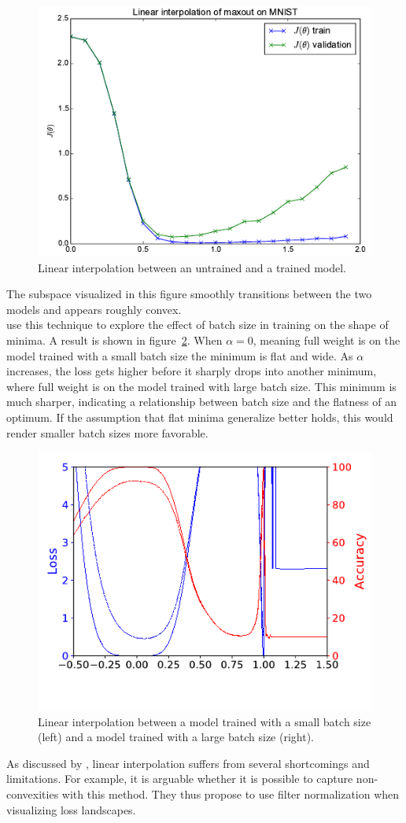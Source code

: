 \documentclass[a4paper]{scrartcl}
\begin{document}
\begin{figure}[H]
	\centering
	\includegraphics[width=.5\linewidth]{figures/linear_interpol_1.png}
	\caption{Linear interpolation between an untrained and a trained model.}
	\label{fig:untrained_trained}
\end{figure}
The subspace visualized in this figure smoothly transitions between the two models and appears roughly convex.\\
\citet{li2017visualizing} use this technique to explore the effect of batch size in training on the shape of minima. A result is shown in figure~\ref{fig:smallbatch_largebatch}. When $\alpha =0$, meaning full weight is on the model trained with a small batch size the minimum is flat and wide. As $\alpha$ increases, the loss gets higher before it sharply drops into another minimum, where full weight is on the model trained with large batch size. This minimum is much sharper, indicating a relationship between batch size and the flatness of an optimum. If the assumption that flat minima generalize better holds, this would render smaller batch sizes more favorable.

\begin{figure}[H]
	\centering
	\includegraphics[width=.5\linewidth]{figures/batch_size_1.png}
	\caption{Linear interpolation between a model trained with a small batch size (left) and a model trained with a large batch size (right).}
	\label{fig:smallbatch_largebatch}
\end{figure}

As discussed by \citet{li2017visualizing}, linear interpolation suffers from several shortcomings and limitations. For example, it is arguable whether it is possible to capture non-convexities with this method. They thus propose to use filter normalization when visualizing loss landscapes.
\end{document}
